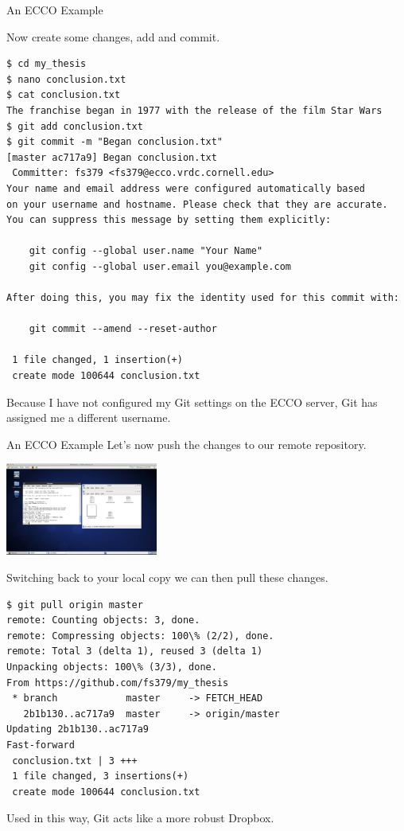 \documentclass[10pt]{beamer}
\begin{document}
\begin{frame}[fragile]{An ECCO Example}

Now create some changes, add and commit.
\begin{lstlisting}
$ cd my_thesis
$ nano conclusion.txt
$ cat conclusion.txt
The franchise began in 1977 with the release of the film Star Wars
$ git add conclusion.txt
$ git commit -m "Began conclusion.txt"
[master ac717a9] Began conclusion.txt
 Committer: fs379 <fs379@ecco.vrdc.cornell.edu>
Your name and email address were configured automatically based
on your username and hostname. Please check that they are accurate.
You can suppress this message by setting them explicitly:

    git config --global user.name "Your Name"
    git config --global user.email you@example.com

After doing this, you may fix the identity used for this commit with:

    git commit --amend --reset-author

 1 file changed, 1 insertion(+)
 create mode 100644 conclusion.txt
\end{lstlisting}
Because I have not configured my Git settings on the ECCO server, Git has assigned me a different username.





\end{frame}

\begin{frame}[fragile]{An ECCO Example}
Let's now push the changes to our remote repository.

\begin{center}
\includegraphics[width=5cm]{./auxfiles/ECCO2.jpg}
\end{center}

Switching back to your local copy we can then pull these changes.
\begin{lstlisting}
$ git pull origin master
remote: Counting objects: 3, done.
remote: Compressing objects: 100\% (2/2), done.
remote: Total 3 (delta 1), reused 3 (delta 1)
Unpacking objects: 100\% (3/3), done.
From https://github.com/fs379/my_thesis
 * branch            master     -> FETCH_HEAD
   2b1b130..ac717a9  master     -> origin/master
Updating 2b1b130..ac717a9
Fast-forward
 conclusion.txt | 3 +++
 1 file changed, 3 insertions(+)
 create mode 100644 conclusion.txt
\end{lstlisting}


Used in this way, Git acts like a more robust Dropbox. \\


\end{frame}
\end{document}
